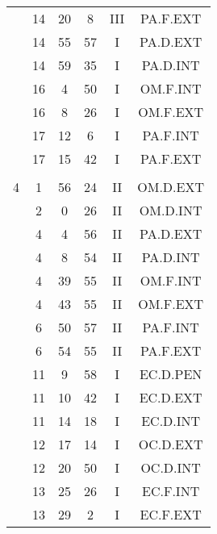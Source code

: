 \documentclass[12pt, a4paper]{article}
\begin{document}
\begin{multicols}{3}
{\begin{tabular}{c c c c c c}
	 	 	 	 & 14 & 20 & 8 & III & PA.F.EXT\\%
	 	 	 	 & 14 & 55 & 57 & I & PA.D.EXT\\%
	 	 	 	 & 14 & 59 & 35 & I & PA.D.INT\\%
	 	 	 	 & 16 & 4 & 50 & I & OM.F.INT\\%
	 	 	 	 & 16 & 8 & 26 & I & OM.F.EXT\\%
	 	 	 	 & 17 & 12 & 6 & I & PA.F.INT\\%
	 	 	 	 & 17 & 15 & 42 & I & PA.F.EXT\\%
	 	 	 	 & & & & & \\%
	 	 	 	4 & 1 & 56 & 24 & II & OM.D.EXT\\%
	 	 	 	 & 2 & 0 & 26 & II & OM.D.INT\\%
	 	 	 	 & 4 & 4 & 56 & II & PA.D.EXT\\%
	 	 	 	 & 4 & 8 & 54 & II & PA.D.INT\\%
	 	 	 	 & 4 & 39 & 55 & II & OM.F.INT\\%
	 	 	 	 & 4 & 43 & 55 & II & OM.F.EXT\\%
	 	 	 	 & 6 & 50 & 57 & II & PA.F.INT\\%
	 	 	 	 & 6 & 54 & 55 & II & PA.F.EXT\\%
	 	 	 	 & 11 & 9 & 58 & I & EC.D.PEN\\%
	 	 	 	 & 11 & 10 & 42 & I & EC.D.EXT\\%
	 	 	 	 & 11 & 14 & 18 & I & EC.D.INT\\%
	 	 	 	 & 12 & 17 & 14 & I & OC.D.EXT\\%
	 	 	 	 & 12 & 20 & 50 & I & OC.D.INT\\%
	 	 	 	 & 13 & 25 & 26 & I & EC.F.INT\\%
	 	 	 	 & 13 & 29 & 2 & I & EC.F.EXT\\%

\end{tabular}}
\end{multicols}
\end{document}
